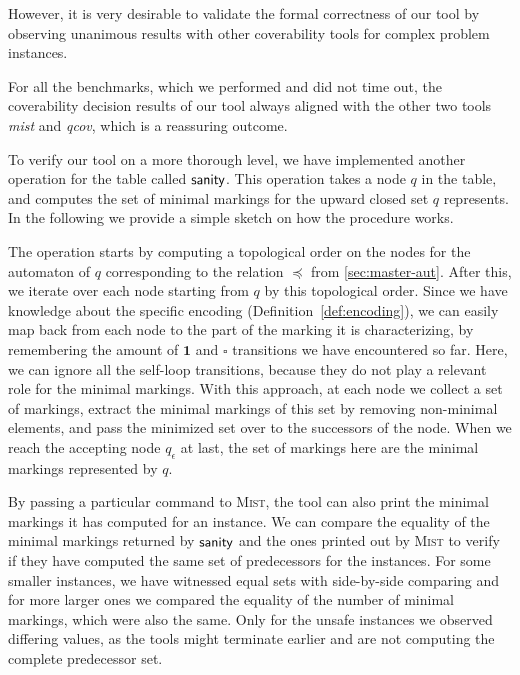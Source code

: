 However, it is very desirable to validate the formal correctness of our tool by observing unanimous results with other coverability tools for complex problem instances.

For all the benchmarks, which we performed and did not time out, the coverability decision results of our tool always aligned with the other two tools \textit{mist} and \textit{qcov}, which is a reassuring outcome. 

To verify our tool on a more thorough level, we have implemented another operation for the table called $\operatorname{\textsf{sanity}}$. This operation takes a node $q$ in the table, and computes the set of minimal markings for the upward closed set $q$ represents. In the following we provide a simple sketch on how the procedure works.

The operation starts by computing a topological order on the nodes for the automaton of $q$ corresponding to the relation $\preceq$ from \autoref{sec:master-aut}. After this, we iterate over each node starting from $q$ by this topological order. Since we have knowledge about the specific encoding (Definition~\autoref{def:encoding}), we can easily map back from each node to the part of the marking it is characterizing, by remembering the amount of $\bm{1}$ and $\square$ transitions we have encountered so far. Here, we can ignore all the self-loop transitions, because they do not play a relevant role for the minimal markings.
With this approach, at each node we collect a set of markings, extract the minimal markings of this set by removing non-minimal elements, and pass the minimized set over to the successors of the node. When we reach the accepting node $q_{\epsilon}$ at last, the set of markings here are the minimal markings represented by $q$.

By passing a particular command to \textsc{Mist}, the tool can also print the minimal markings it has computed for an instance. We can compare the equality of the minimal markings returned by $\operatorname{\textsf{sanity}}$ and the ones printed out by \textsc{Mist} to verify if they have computed the same set of predecessors for the instances. For some smaller instances, we have witnessed equal sets with side-by-side comparing and for more larger ones we compared the equality of the number of minimal markings, which were also the same. Only for the unsafe instances we observed differing values, as the tools might terminate earlier and are not computing the complete predecessor set.